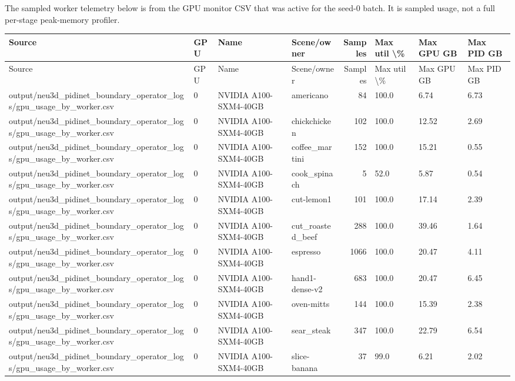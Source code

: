 \documentclass[10pt]{article}
\begin{document}
The sampled worker telemetry below is from the GPU monitor CSV that was active for the seed-0 batch. It is sampled usage, not a full per-stage peak-memory profiler.
\small
\begin{longtable}{p{7cm}lllrlll}
\toprule
Source & GPU & Name & Scene/owner & Samples & Max util \textbackslash{}\% & Max GPU GB & Max PID GB \\
\midrule
\endfirsthead
\toprule
Source & GPU & Name & Scene/owner & Samples & Max util \textbackslash{}\% & Max GPU GB & Max PID GB \\
\midrule
\endhead
output/neu3d\_pidinet\_boundary\_operator\_logs/gpu\_usage\_by\_worker.csv & 0 & NVIDIA A100-SXM4-40GB & americano & 84 & 100.0 & 6.74 & 6.73 \\
output/neu3d\_pidinet\_boundary\_operator\_logs/gpu\_usage\_by\_worker.csv & 0 & NVIDIA A100-SXM4-40GB & chickchicken & 102 & 100.0 & 12.52 & 2.69 \\
output/neu3d\_pidinet\_boundary\_operator\_logs/gpu\_usage\_by\_worker.csv & 0 & NVIDIA A100-SXM4-40GB & coffee\_martini & 152 & 100.0 & 15.21 & 0.55 \\
output/neu3d\_pidinet\_boundary\_operator\_logs/gpu\_usage\_by\_worker.csv & 0 & NVIDIA A100-SXM4-40GB & cook\_spinach & 5 & 52.0 & 5.87 & 0.54 \\
output/neu3d\_pidinet\_boundary\_operator\_logs/gpu\_usage\_by\_worker.csv & 0 & NVIDIA A100-SXM4-40GB & cut-lemon1 & 101 & 100.0 & 17.14 & 2.39 \\
output/neu3d\_pidinet\_boundary\_operator\_logs/gpu\_usage\_by\_worker.csv & 0 & NVIDIA A100-SXM4-40GB & cut\_roasted\_beef & 288 & 100.0 & 39.46 & 1.64 \\
output/neu3d\_pidinet\_boundary\_operator\_logs/gpu\_usage\_by\_worker.csv & 0 & NVIDIA A100-SXM4-40GB & espresso & 1066 & 100.0 & 20.47 & 4.11 \\
output/neu3d\_pidinet\_boundary\_operator\_logs/gpu\_usage\_by\_worker.csv & 0 & NVIDIA A100-SXM4-40GB & hand1-dense-v2 & 683 & 100.0 & 20.47 & 6.45 \\
output/neu3d\_pidinet\_boundary\_operator\_logs/gpu\_usage\_by\_worker.csv & 0 & NVIDIA A100-SXM4-40GB & oven-mitts & 144 & 100.0 & 15.39 & 2.38 \\
output/neu3d\_pidinet\_boundary\_operator\_logs/gpu\_usage\_by\_worker.csv & 0 & NVIDIA A100-SXM4-40GB & sear\_steak & 347 & 100.0 & 22.79 & 6.54 \\
output/neu3d\_pidinet\_boundary\_operator\_logs/gpu\_usage\_by\_worker.csv & 0 & NVIDIA A100-SXM4-40GB & slice-banana & 37 & 99.0 & 6.21 & 2.02 \\

\end{longtable}
\end{document}
